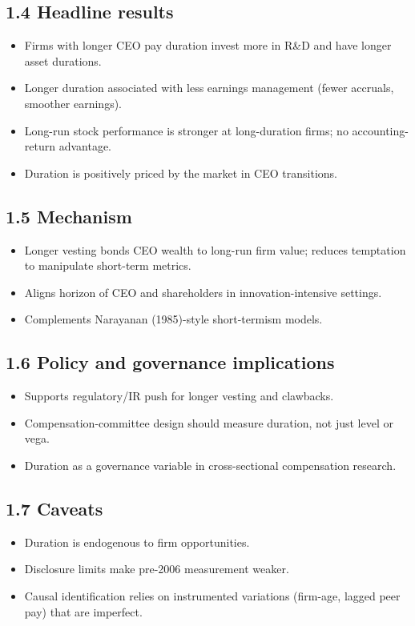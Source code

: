 \documentclass[11pt]{article}
\begin{document}
\subsection*{1.4 Headline results}
\begin{itemize}
\item Firms with longer CEO pay duration invest more in R\&D and have longer asset durations.
\item Longer duration associated with less earnings management (fewer accruals, smoother earnings).
\item Long-run stock performance is stronger at long-duration firms; no accounting-return advantage.
\item Duration is positively priced by the market in CEO transitions.
\end{itemize}

\subsection*{1.5 Mechanism}
\begin{itemize}
\item Longer vesting bonds CEO wealth to long-run firm value; reduces temptation to manipulate short-term metrics.
\item Aligns horizon of CEO and shareholders in innovation-intensive settings.
\item Complements Narayanan (1985)-style short-termism models.
\end{itemize}

\subsection*{1.6 Policy and governance implications}
\begin{itemize}
\item Supports regulatory/IR push for longer vesting and clawbacks.
\item Compensation-committee design should measure duration, not just level or vega.
\item Duration as a governance variable in cross-sectional compensation research.
\end{itemize}

\subsection*{1.7 Caveats}
\begin{alertbox}
\begin{itemize}
\item Duration is endogenous to firm opportunities.
\item Disclosure limits make pre-2006 measurement weaker.
\item Causal identification relies on instrumented variations (firm-age, lagged peer pay) that are imperfect.
\end{itemize}
\end{alertbox}
\end{document}
